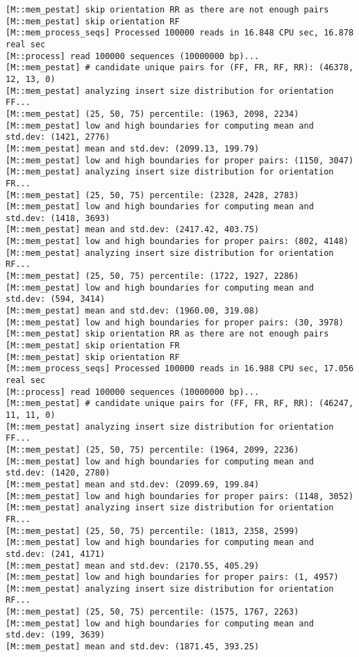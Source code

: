 \begin{lstlisting}
[M::mem_pestat] skip orientation RR as there are not enough pairs
[M::mem_pestat] skip orientation RF
[M::mem_process_seqs] Processed 100000 reads in 16.848 CPU sec, 16.878 real sec
[M::process] read 100000 sequences (10000000 bp)...
[M::mem_pestat] # candidate unique pairs for (FF, FR, RF, RR): (46378, 12, 13, 0)
[M::mem_pestat] analyzing insert size distribution for orientation FF...
[M::mem_pestat] (25, 50, 75) percentile: (1963, 2098, 2234)
[M::mem_pestat] low and high boundaries for computing mean and std.dev: (1421, 2776)
[M::mem_pestat] mean and std.dev: (2099.13, 199.79)
[M::mem_pestat] low and high boundaries for proper pairs: (1150, 3047)
[M::mem_pestat] analyzing insert size distribution for orientation FR...
[M::mem_pestat] (25, 50, 75) percentile: (2328, 2428, 2783)
[M::mem_pestat] low and high boundaries for computing mean and std.dev: (1418, 3693)
[M::mem_pestat] mean and std.dev: (2417.42, 403.75)
[M::mem_pestat] low and high boundaries for proper pairs: (802, 4148)
[M::mem_pestat] analyzing insert size distribution for orientation RF...
[M::mem_pestat] (25, 50, 75) percentile: (1722, 1927, 2286)
[M::mem_pestat] low and high boundaries for computing mean and std.dev: (594, 3414)
[M::mem_pestat] mean and std.dev: (1960.00, 319.08)
[M::mem_pestat] low and high boundaries for proper pairs: (30, 3978)
[M::mem_pestat] skip orientation RR as there are not enough pairs
[M::mem_pestat] skip orientation FR
[M::mem_pestat] skip orientation RF
[M::mem_process_seqs] Processed 100000 reads in 16.988 CPU sec, 17.056 real sec
[M::process] read 100000 sequences (10000000 bp)...
[M::mem_pestat] # candidate unique pairs for (FF, FR, RF, RR): (46247, 11, 11, 0)
[M::mem_pestat] analyzing insert size distribution for orientation FF...
[M::mem_pestat] (25, 50, 75) percentile: (1964, 2099, 2236)
[M::mem_pestat] low and high boundaries for computing mean and std.dev: (1420, 2780)
[M::mem_pestat] mean and std.dev: (2099.69, 199.84)
[M::mem_pestat] low and high boundaries for proper pairs: (1148, 3052)
[M::mem_pestat] analyzing insert size distribution for orientation FR...
[M::mem_pestat] (25, 50, 75) percentile: (1813, 2358, 2599)
[M::mem_pestat] low and high boundaries for computing mean and std.dev: (241, 4171)
[M::mem_pestat] mean and std.dev: (2170.55, 405.29)
[M::mem_pestat] low and high boundaries for proper pairs: (1, 4957)
[M::mem_pestat] analyzing insert size distribution for orientation RF...
[M::mem_pestat] (25, 50, 75) percentile: (1575, 1767, 2263)
[M::mem_pestat] low and high boundaries for computing mean and std.dev: (199, 3639)
[M::mem_pestat] mean and std.dev: (1871.45, 393.25)

\end{lstlisting}
